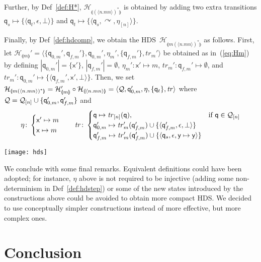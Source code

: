 \documentclass[runningheads,a4paper]{llncs}
\newcommand{\hdof}[1]{\mathcal H_{\nretohds{#1}}}
\newcommand{\nrebinder}[1]{\tuple{#1}}
\newcommand{\q}{\mathsf{q}}
\newcommand{\x}{\mathsf{x}}
\newcommand{\y}{\mathsf{y}}
\newcommand{\nretohds}[1]{\llparenthesis #1 \rrparenthesis}
\newcommand{\pushtr}{\curvearrowright}
\newcommand{\trans}{\mathit{tr}}
\newcommand{\emptystr}{\epsilon}
\newcommand{\weight}[1]{|#1|}
\newcommand{\hds}{HDS}
\newcommand{\hdns}{HDS}
\newcommand{\Q}{{\cal Q}}
\newcommand{\tuple}[1]{\langle#1\rangle}
\newcommand{\hdtr}[3]{\tuple{#2,#1,#3}}
\begin{document}
Further, by Def~\ref{def:H*}, $\hdof{(\tuple{n.mn})^\ast}$ is obtained
by adding two extra transitions $\q_s \mapsto \{\hdtr \emptystr {\q_t}
\bot\}$ and $\q_t \mapsto \{\hdtr \pushtr {\q_s} {\eta_{[n]}}\}$.

Finally, by Def~\ref{def:hdcomp}, we obtain the \hds\ $\hdof
{m\left(\nrebinder{n.mn}\right)^\ast}$ as follows.
First, let $\hdof m ' = \tuple{\{\q_{0,m}',\q_{f,m}'\}, \q_{0,m}',
  \eta_m', \{\q_{f,m}'\}, \trans_m'}$ be obtained as in~(\ref{eq:Hm})
by defining $\weight{\q_{0,m}'} = \{\x'\}$, $\weight{\q_{f,m}'} =
\emptyset$, $\eta_m' \colon \x' \mapsto m$, $\trans_m' \colon \q_{f,m}'
\mapsto \emptyset$, and $\trans_m' \colon \q_{0,m}' \mapsto \{\hdtr {\x'}
{\q_{f,m}'} \bot\}$.
Then, we set $\hdof {m\left(\nrebinder{n.mn}\right)^\ast} = \hdof m '
\circ \hdof{\nrebinder{n.mn}} = \tuple{\Q, \q_{0,m}', \eta, \{\q_t\}, \trans}$
where $\Q = \Q_{[n]} \cup \{\q_{0,m}',\q_{f,m}'\}$ and
\[
\eta \colon \begin{cases}
  \x' \mapsto m
  \\
  \x \mapsto m
\end{cases}
\quad
\trans \colon \begin{cases}
  \q \mapsto \trans_{[n]}(\q), & \text{if } \q \in \Q_{[n]}
  \\
  \q_{0,m}' \mapsto \trans_m'(\q_{f,m}') \cup \{\hdtr \emptystr {\q_{f,m}'} \bot\}
  \\
  \q_{f,m}' \mapsto \trans_m'(\q_{f,m}') \cup \{\hdtr \emptystr {\q_s} {\y \mapsto \y}\}
\end{cases}
\]


  \begin{center}
    \begin{minipage}{\linewidth}\centering
      \texttt{[image: hds]}
    \end{minipage}
  \end{center}



We conclude with some final remarks.
Equivalent definitions could have been adopted; for instance, $\eta$
above is not required to be injective (adding some non-determinism in
Def~\ref{def:hdstep}) or some of the new states introduced by the
constructions above could be avoided to obtain more compact \hdns.
We decided to use conceptually simpler constructions instead of more
effective, but more complex ones.


\section{Conclusion}
\end{document}
